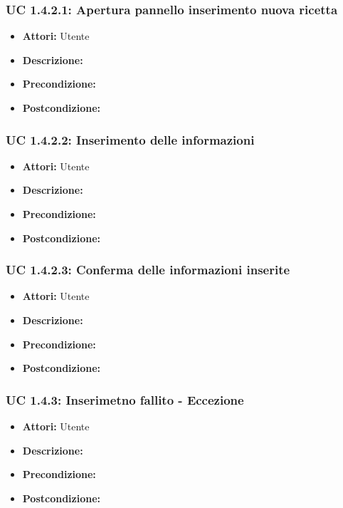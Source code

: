 \subsubsection{UC 1.4.2.1: Apertura pannello inserimento nuova ricetta}

\begin{itemize}
\item \textbf{Attori:} Utente
\item \textbf{Descrizione:} 
\item \textbf{Precondizione:} 
\item \textbf{Postcondizione:} 
\end{itemize}

\subsubsection{UC 1.4.2.2: Inserimento delle informazioni }

\begin{itemize}
\item \textbf{Attori:} Utente
\item \textbf{Descrizione:} 
\item \textbf{Precondizione:} 
\item \textbf{Postcondizione:} 
\end{itemize}

\subsubsection{UC 1.4.2.3: Conferma delle informazioni inserite}

\begin{itemize}
\item \textbf{Attori:} Utente
\item \textbf{Descrizione:} 
\item \textbf{Precondizione:} 
\item \textbf{Postcondizione:} 
\end{itemize}

\subsubsection{UC 1.4.3: Inserimetno fallito - Eccezione}

\begin{itemize}
\item \textbf{Attori:} Utente
\item \textbf{Descrizione:} 
\item \textbf{Precondizione:} 
\item \textbf{Postcondizione:} 
\end{itemize}

